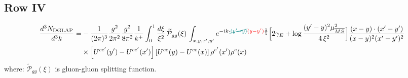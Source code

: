 \documentclass[9pt]{article}
\numberwithin{equation}{section}
\begin{document}
\subsection{Row IV}
\begin{align}
\frac{d^{3}N_{\rm DGLAP}}{d^{3}k}= &-\frac{1}{(2\pi)^{3}}\frac{g^{2}}{2\pi^{2}}\frac{g^{2}}{8\pi^{2}}\frac{1}{k^{+}}\int_{0}^{1}\frac{d\xi}{\xi^{2}}\,\widetilde{\mathcal P}_{gg}(\xi)\,\int_{x,y,x',y'}e^{-ik\cdot{\color{teal}\cancel{(y'-y)}}{\color{red}(y-y')}\frac{1}{\xi}}\Big[2\gamma_{E}+\log\frac{(y'-y)^{2}\mu^{2}_{\overline{MS}}}{4\,\xi^{2}}\Big]\frac{(x-y)\cdot(x'-y')}{(x-y)^{2}(x'-y')^{2}}\notag\\
&\times\left[U^{ce'}(y') - U^{ce'}(x')\right]\left[U^{ce}(y) - U^{ce}(x)\right]\rho^{e'}(x')\rho^{e}(x)
\end{align}
where:
$\widetilde{\mathcal{P}}_{gg}(\xi)$ is gluon-gluon splitting function.
\end{document}
